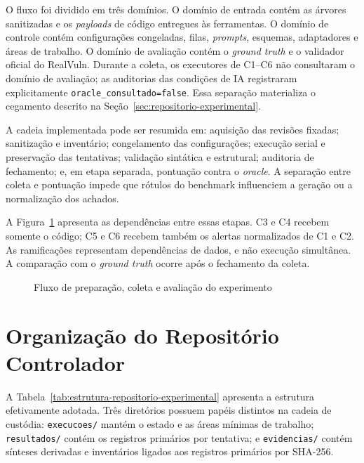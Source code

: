 O fluxo foi dividido em três domínios. O domínio de entrada contém as árvores sanitizadas e os \textit{payloads} de código entregues às ferramentas. O domínio de controle contém configurações congeladas, filas, \textit{prompts}, esquemas, adaptadores e áreas de trabalho. O domínio de avaliação contém o \textit{ground truth} e o validador oficial do RealVuln. Durante a coleta, os executores de C1--C6 não consultaram o domínio de avaliação; as auditorias das condições de IA registraram explicitamente \texttt{oracle\_consultado=false}. Essa separação materializa o cegamento descrito na Seção~\ref{sec:repositorio-experimental}.

A cadeia implementada pode ser resumida em: aquisição das revisões fixadas; sanitização e inventário; congelamento das configurações; execução serial e preservação das tentativas; validação sintática e estrutural; auditoria de fechamento; e, em etapa separada, pontuação contra o \textit{oracle}. A separação entre coleta e pontuação impede que rótulos do benchmark influenciem a geração ou a normalização dos achados.

A Figura~\ref{fig:fluxo-desenvolvimento} apresenta as dependências entre essas etapas. C3 e C4 recebem somente o código; C5 e C6 recebem também os alertas normalizados de C1 e C2. As ramificações representam dependências de dados, e não execução simultânea. A comparação com o \textit{ground truth} ocorre após o fechamento da coleta.

\begin{figure}[htbp]
\centering
\caption{\label{fig:fluxo-desenvolvimento}Fluxo de preparação, coleta e avaliação do experimento}

\end{figure}

\section{Organização do Repositório Controlador}\label{sec:organizacao-repositorio-desenvolvimento}

A Tabela~\ref{tab:estrutura-repositorio-experimental} apresenta a estrutura efetivamente adotada. Três diretórios possuem papéis distintos na cadeia de custódia: \texttt{execucoes/} mantém o estado e as áreas mínimas de trabalho; \texttt{resultados/} contém os registros primários por tentativa; e \texttt{evidencias/} contém sínteses derivadas e inventários ligados aos registros primários por SHA-256.


